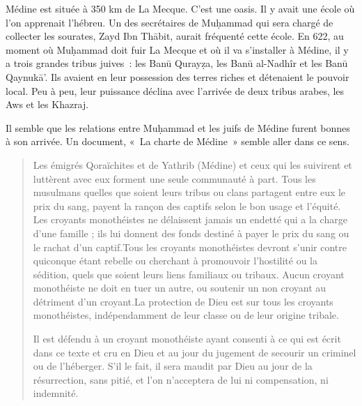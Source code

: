 Médine est située à 350 km de La Mecque. C'est une oasis. Il y avait une
école où l'on apprenait l'hébreu. Un des secrétaires de Muḥammad qui
sera chargé de collecter les sourates, Zayd Ibn Thābit, aurait fréquenté
cette école. En 622, au moment où Muḥammad doit fuir La Mecque et où il
va s'installer à Médine, il y a trois grandes tribus juives~: les Banū
Qurayẓa, les Banū al-Nadhîr et les Banū Qaynukā'. Ils avaient en leur
possession des terres riches et détenaient le pouvoir local. Peu à peu,
leur puissance déclina avec l'arrivée de deux tribus arabes, les Aws et
les Khazraj.

Il semble que les relations entre Muḥammad et les juifs de Médine furent
bonnes à son arrivée. Un document, «~La charte de Médine~» semble aller
dans ce sens.

\begin{quote}
 
 
 
{Les émigrés Qoraïchites et de Yathrib (Médine) et ceux
qui les suivirent et luttèrent avec eux forment une seule communauté à
part. Tous les musulmans quelles que soient leurs tribus ou
clans partagent entre eux le prix du sang, payent la rançon des captifs
selon le bon usage et
l'équité.
Les croyants monothéistes ne délaissent jamais un endetté
qui a la charge d'une famille ; ils lui donnent des fonds destiné à
payer le prix du sang ou le rachat d'un
captif.Tous les croyants monothéistes devront s'unir contre
quiconque étant rebelle ou cherchant à promouvoir l'hostilité ou la
sédition, quels que soient leurs liens familiaux ou
tribaux.  Aucun croyant monothéiste ne doit en tuer un autre, ou
soutenir un non croyant au détriment d'un
croyant.La protection de Dieu est sur tous les croyants
monothéistes, indépendamment de leur classe ou de leur origine
tribale.} 
 
 
{Il est défendu à un croyant monothéiste ayant consenti à
ce qui est écrit dans ce texte et cru en Dieu et au jour du jugement de
secourir un criminel ou de l'héberger. S'il le fait, il sera maudit par
Dieu au jour de la résurrection, sans pitié, et l'on n'acceptera de lui
ni compensation, ni
indemnité.}
 \end{quote}
     
